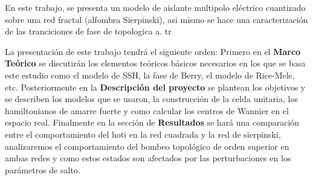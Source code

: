 En este trabajo, se presenta un modelo de aislante multipolo eléctrico cuantizado sobre una red fractal (alfombra Sierpinski), asi mismo se hace una caracterización de las tranciciones de fase de topologica a. tr



La presentación de este trabajo tendrá el siguiente orden: Primero en el \textbf{Marco Teórico} se discutirán los elementos teóricos básicos necesarios en los que se basa este estudio como el modelo de SSH, la fase de Berry, el modelo de Rice-Mele, etc. Posteriormente en la \textbf{Descripción del proyecto} se plantean los objetivos y se describen los modelos que se usaron, la construcción de la celda unitaria, los hamiltonianos de amarre fuerte y como calcular los centros de Wannier en el espacio real. Finalmente en la sección de \textbf{Resultados} se hará una comparación entre el comportamiento del hoti en la red cuadrada y la red de sierpinski, analizaremos el comportamiento del bombeo topológico de orden superior en ambas redes y como estos estados son afectados por las perturbaciones en los parámetros de salto.

